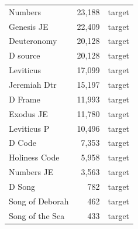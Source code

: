 \documentclass[10pt,letterpaper]{article}
\begin{document}
\begin{table}[!ht]
\begin{tabular}{lrl}
Numbers & 23{,}188 & target \\
Genesis JE & 22{,}409 & target \\
Deuteronomy & 20{,}128 & target \\
D source & 20{,}128 & target \\
Leviticus & 17{,}099 & target \\
Jeremiah Dtr & 15{,}197 & target \\
D Frame & 11{,}993 & target \\
Exodus JE & 11{,}780 & target \\
Leviticus P & 10{,}496 & target \\
D Code & 7{,}353 & target \\
Holiness Code & 5{,}958 & target \\
Numbers JE & 3{,}563 & target \\
D Song & 782 & target \\
Song of Deborah & 462 & target \\
Song of the Sea & 433 & target \\
\hline
\end{tabular}
\label{tab:s5_words}
\end{table}
\end{document}
